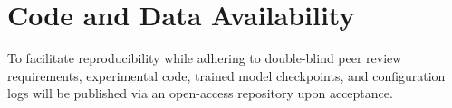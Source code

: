 \documentclass[runningheads]{llncs}
\begin{document}
\section*{Code and Data Availability}
To facilitate reproducibility while adhering to double-blind peer review requirements, experimental code, trained model checkpoints, and configuration logs will be published via an open-access repository upon acceptance.



\end{document}
